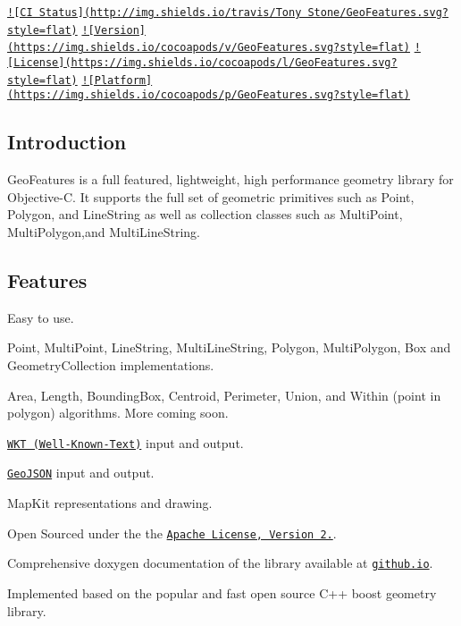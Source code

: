 \href{https://travis-ci.org/Tony Stone/GeoFeatures}{\tt !\mbox{[}C\+I Status\mbox{]}(http\+://img.\+shields.\+io/travis/\+Tony Stone/\+Geo\+Features.\+svg?style=flat)} \href{http://cocoapods.org/pods/GeoFeatures}{\tt !\mbox{[}Version\mbox{]}(https\+://img.\+shields.\+io/cocoapods/v/\+Geo\+Features.\+svg?style=flat)} \href{http://cocoapods.org/pods/GeoFeatures}{\tt !\mbox{[}License\mbox{]}(https\+://img.\+shields.\+io/cocoapods/l/\+Geo\+Features.\+svg?style=flat)} \href{http://cocoapods.org/pods/GeoFeatures}{\tt !\mbox{[}Platform\mbox{]}(https\+://img.\+shields.\+io/cocoapods/p/\+Geo\+Features.\+svg?style=flat)}

\subsection*{Introduction}

Geo\+Features is a full featured, lightweight, high performance geometry library for Objective-\/\+C. It supports the full set of geometric primitives such as Point, Polygon, and Line\+String as well as collection classes such as Multi\+Point, Multi\+Polygon,and Multi\+Line\+String.

\subsection*{Features}


\begin{DoxyItemize}
\item Easy to use.
\item Point, Multi\+Point, Line\+String, Multi\+Line\+String, Polygon, Multi\+Polygon, Box and Geometry\+Collection implementations.
\item Area, Length, Bounding\+Box, Centroid, Perimeter, Union, and Within (point in polygon) algorithms. More coming soon.
\item \href{https://en.wikipedia.org/wiki/Well-known_text}{\tt W\+K\+T (Well-\/\+Known-\/\+Text)} input and output.
\item \href{http://geojson.org/}{\tt Geo\+J\+S\+O\+N} input and output.
\item Map\+Kit representations and drawing.
\item Open Sourced under the the \href{http://www.apache.org/licenses/LICENSE-2.0.html}{\tt Apache License, Version 2.}.
\item Comprehensive doxygen documentation of the library available at \href{http://tonystone.github.io/geofeatures}{\tt github.\+io}.
\item Implemented based on the popular and fast open source C++ boost geometry library.
\end{DoxyItemize}

